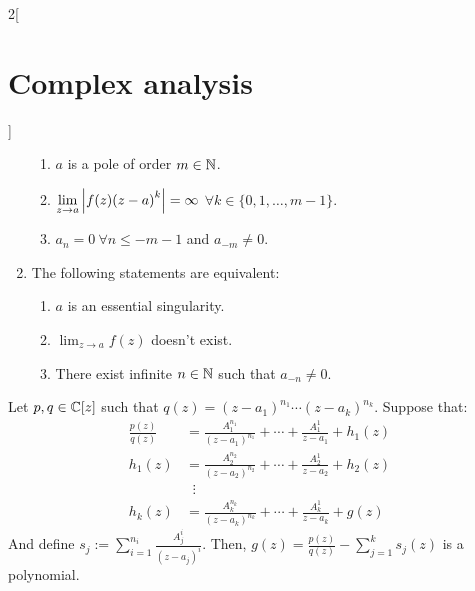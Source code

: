 \documentclass[../../../main_math.tex]{subfiles}
\begin{document}
\begin{multicols}{2}[\section{Complex analysis}]
\begin{corollary}
\begin{enumerate}
            \begin{enumerate}
              \item $a$ is a pole of order $m\in\mathbb{N}$.
              \item $\displaystyle\lim_{z\to a} \abs{f(z){(z-a)}^k}= \infty$ $\forall k\in\{0,1,\ldots,m-1\}$.
              \item $a_n=0\ \forall n\leq -m-1$ and $a_{-m}\ne 0$.
            \end{enumerate}
      \item  The following statements are equivalent:
            \begin{enumerate}
              \item $a$ is an essential singularity.
              \item $\displaystyle\lim_{z\to a} f(z)$ doesn't exist.
              \item There exist infinite $n\in\mathbb{N}$ such that $a_{-n}\ne 0$.
            \end{enumerate}
    \end{enumerate}
  \end{corollary}
  \begin{corollary}
    Let $p,q\in\mathbb{C}[z]$ such that $q(z)={(z-a_1)}^{n_1}\cdots{(z-a_k)}^{n_k}$. Suppose that:
    \begin{align*}
      \frac{p(z)}{q(z)} & =\frac{A_1^{n_1}}{{(z-a_1)}^{n_1}}+\cdots+\frac{A_1^{1}}{z-a_1}+h_1(z) \\
      h_1(z)            & =\frac{A_2^{n_2}}{{(z-a_2)}^{n_2}}+\cdots+\frac{A_2^{1}}{z-a_2}+h_2(z) \\
                        & \;\;\vdots                                                             \\
      h_k(z)            & =\frac{A_k^{n_k}}{{(z-a_k)}^{n_k}}+\cdots+\frac{A_k^{1}}{z-a_k}+g(z)
    \end{align*}
    And define $s_j:=\sum_{i= 1}^{n_i}\frac{A_j^i}{{(z-a_j)}^i}$.
    Then, $g(z)=\frac{p(z)}{q(z)}-\sum_{j=1}^k s_j(z)$ is a polynomial.
  \end{corollary}

\end{multicols}
\end{document}
